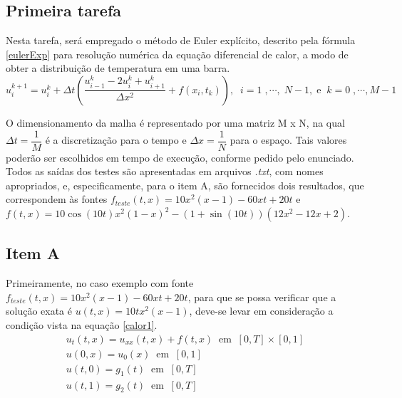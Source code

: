 \documentclass[12pt]{article}
\begin{document}
\tableofcontents 
\clearpage
\begin{spacing}{1.5}

\section{Primeira tarefa}

Nesta tarefa, será empregado o método de Euler explícito, descrito pela fórmula \eqref{eulerExp} para resolução numérica da equação diferencial de calor, a modo de obter a distribuição de temperatura em uma barra.
\label{eulerExp}\begin{equation}
u_{i}^{k+1} = u_{i}^{k} + \Delta t (\frac{u_{i-1}^{k} - 2u_{i}^{k}+ u_{i+1}^{k}}{\Delta x^2}  +f(x_{i},t_{k})) , \;\; i = 1\;,\cdots ,\; N - 1, \;\text{e} \;\; k = 0\;, \cdots , M - 1\;
\end{equation}

O dimensionamento da malha é representado por uma matriz M x N, na qual $\Delta t = \dfrac{1}{M}$ \;é a discretização para o tempo e $\Delta x = \dfrac{1}{N}$ para o espaço. Tais valores poderão ser escolhidos em tempo de execução, conforme pedido pelo enunciado. Todos as saídas dos testes são apresentadas em arquivos \textit{.txt}, com nomes apropriados, e, especificamente, para o item A, são fornecidos dois resultados, que correspondem às fontes $f_{teste}(t,x)=10x^{2}(x-1)-60xt+20t$ e $f(t,x)=10\cos(10t)x^{2}(1-x)^{2}-(1+\sin(10t))(12x^{2}-12x+2)$.


\subsection{Item A}

Primeiramente, no caso exemplo com fonte $f_{teste}(t,x)=10x^{2} (x-1)-60xt+20t$, para que se possa verificar que a solução exata é $u(t,x)=10tx^{2}(x-1)$, deve-se levar em consideração a condição vista na equação \eqref{calor1}.
\begin{gather}
u_{t}(t,x) = u_{xx}(t,x) + f(t,x) \;\; \text{em} \;\; [0,T]\times[0,1] \label{calor1}\\
u(0,x)=u_0(x) \;\;\text{em}\;\; [0,1] \label{calor2}\\
u(t,0)=g_1(t) \;\;\text{em}\;\; [0,T] \label{calor3}\\
u(t,1)=g_2(t) \;\;\text{em}\;\; [0,T] \label{calor4}
\end{gather}


\end{spacing}
\end{document}
